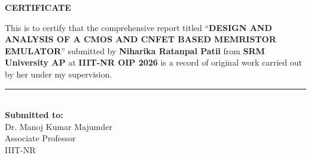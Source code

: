 \thispagestyle{empty}
\vspace*{2cm}

\begin{center}
    {\Huge \textbf{CERTIFICATE}}
\end{center}

\vspace{1.5cm}

This is to certify that the comprehensive report titled ``\textbf{DESIGN AND ANALYSIS OF A CMOS AND CNFET BASED MEMRISTOR EMULATOR}'' submitted by \textbf{Niharika Ratanpal Patil} from \textbf{SRM University AP} at \textbf{IIIT-NR OIP 2026} is a record of original work carried out by her under my supervision.

\vspace{4cm}

\hfill
\begin{minipage}{0.45\textwidth}
    \centering
    \rule{7cm}{0.4pt} \\
    \vspace{0.3cm}
    \textbf{Submitted to:} \\
    \vspace{0.2cm}
    Dr. Manoj Kumar Majumder \\
    Associate Professor \\
    IIIT-NR
\end{minipage}
